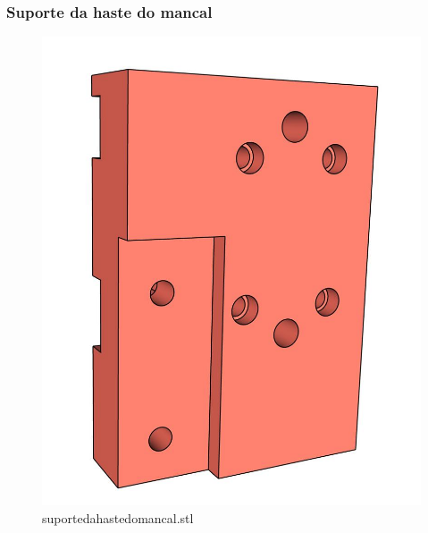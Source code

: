 \begin{frame}
    \frametitle{Suporte da haste do mancal}
        \begin{figure}
            \centering
            \includegraphics[scale = 0.12]{figuras/ressuportehastemancalf}
            \caption{suportedahastedomancal.stl}
        \end{figure}
\end{frame}


